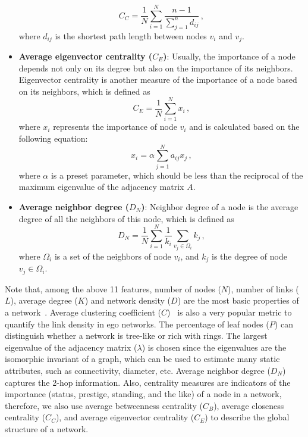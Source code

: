 \documentclass[10pt,journal,compsoc]{IEEEtran}
\begin{document}
\begin{itemize}
\begin{equation}
C_C=\frac{1}{N}\sum_{i=1}^N\frac{{n-1}}{{\sum_{j=1}^n {{d_{ij}}} }}\,,
\end{equation}
where $d_{ij}$ is the shortest path length between nodes $v_i$ and $v_j$.
\item \textbf{Average eigenvector centrality ($C_E$)}: Usually, the importance of a node depends not only on its degree but also on the importance of its neighbors. Eigenvector centrality is another measure of the importance of a node based on its neighbors, which is defined as
\begin{equation}
C_E = \frac{1}{N} \sum_{i=1}^N x_i\,,
\end{equation}
where $x_i$ represents the importance of node $v_i$ and is calculated based on the following equation:
\begin{equation}
x_i = \alpha \sum_{j=1}^N {a_{ij}x_j}\,,
\end{equation}
where $\alpha$ is a preset parameter, which should be less than the reciprocal of the maximum eigenvalue of the adjacency matrix $A$.
\item \textbf{Average neighbor degree ($D_N$)}: Neighbor degree of a node is the average degree of all the neighbors of this node, which is defined as
\begin{equation}
D_N=\frac{1}{N}\sum_{i=1}^N \frac{1}{k_i}{\sum_{v_j\in \Omega_i} k_j}\,,
\end{equation}
where $\Omega_i$ is a set of the neighbors of node $v_i$, and $k_j$ is the degree of node $v_j\in{\Omega_i}$.
\end{itemize}

Note that, among the above 11 features, number of nodes ($N$), number of links ($L$), average degree ($K$) and network density ($D$) are the most basic properties of a network~\cite{xiaofan2012network}. Average clustering coefficient ($C$)~\cite{soffer2005network} is also a very popular metric to quantify the link density in ego networks. The percentage of leaf nodes ($P$) can distinguish whether a network is tree-like or rich with rings. The largest eigenvalue of the adjacency matrix ($\lambda$) is chosen since the eigenvalues  are the isomorphic invariant of a graph, which can be used to estimate many static attributes, such as connectivity, diameter, etc. Average neighbor degree ($D_N$) captures the 2-hop information. Also, centrality measures are indicators of the importance (status, prestige, standing, and the like) of a node in a network, therefore, we also use average betweenness centrality ($C_B$), average closeness centrality ($C_C$), and average eigenvector centrality ($C_E$) to describe the global structure of a network.
\end{document}

